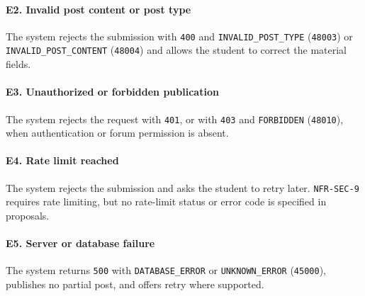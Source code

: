 \documentclass[12pt]{article}
\begin{document}
\hypertarget{sec:e2-invalid-post-content-or-post-type}{}
\paragraph*{E2. Invalid post content or post type}
\par\medskip

The system rejects the submission with \texttt{400} and \texttt{INVALID\_POST\_TYPE} (\texttt{48003}) or \texttt{INVALID\_POST\_CONTENT} (\texttt{48004}) and allows the student to correct the material fields.
\par\medskip

\hypertarget{sec:e3-unauthorized-or-forbidden-publication}{}
\paragraph*{E3. Unauthorized or forbidden publication}
\par\medskip

The system rejects the request with \texttt{401}, or with \texttt{403} and \texttt{FORBIDDEN} (\texttt{48010}), when authentication or forum permission is absent.
\par\medskip

\hypertarget{sec:e4-rate-limit-reached}{}
\paragraph*{E4. Rate limit reached}
\par\medskip

The system rejects the submission and asks the student to retry later. \texttt{NFR-SEC-9} requires rate limiting, but no rate-limit status or error code is specified in proposals.
\par\medskip

\hypertarget{sec:e5-server-or-database-failure}{}
\paragraph*{E5. Server or database failure}
\par\medskip

The system returns \texttt{500} with \texttt{DATABASE\_ERROR} or \texttt{UNKNOWN\_ERROR} (\texttt{45000}), publishes no partial post, and offers retry where supported.
\par\medskip

\hypertarget{sec:b7-business-rules}{}
\end{document}
